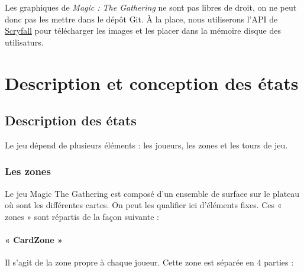 \documentclass[a4paper,12pt]{article}
\begin{document}
Les graphiques de \emph{Magic : The Gathering} ne sont pas libres de droit, on ne peut donc pas les mettre dans le dépôt Git.
À la place, nous utiliserons l'API de \href{https://scryfall.com/}{Scryfall} pour télécharger les images et les placer dans la mémoire disque des utilisaturs.

\clearpage
\section{Description et conception des états}

\subsection{Description des états}

Le jeu dépend de plusieurs éléments : les joueurs, les zones et les tours de jeu. 

\subsubsection{Les zones}

Le jeu Magic The Gathering est composé d’un ensemble de surface sur le plateau où sont les différentes cartes. On peut les qualifier ici d’éléments fixes. 
Ces « zones » sont répartis de la façon suivante : 

\paragraph{« CardZone »}
Il s’agit de la zone propre à chaque joueur. Cette zone est séparée en 4 parties : 
\end{document}
